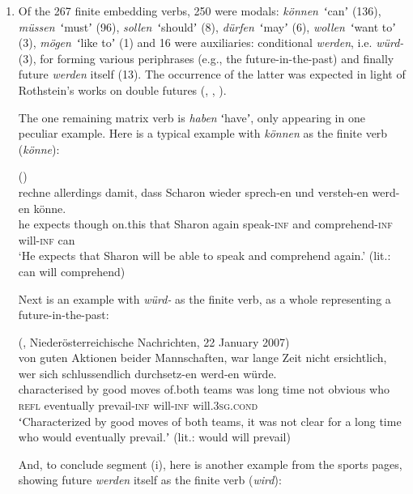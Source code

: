 \documentclass[output=paper,hidelinks]{langscibook}
\begin{document}
\begin{enumerate}[label=(\roman*)]
\item Of the 267 finite embedding verbs, 250 were modals: \emph{können}~ʻcanʼ (136), \emph{müssen}~ʻmustʼ (96), \emph{sollen}~ʻshouldʼ (8), \emph{dürfen}~ʻmayʼ (6), \emph{wollen}~ʻwant toʼ (3), \emph{mögen}~ʻlike toʼ (1) and 16 were auxiliaries: conditional \emph{werden}, i.e. \emph{würd-} (3), for forming various periphrases (e.g., the future-in-the-past) and finally future \emph{werden} itself (13). The occurrence of the latter was expected in light of Rothstein’s works on double futures (\citealt{Rothstein2012}, \citealt{Rothstein2013a}, \citealt{Rothstein2013b}). 

The one remaining matrix verb is \emph{haben} ʻhaveʼ, only appearing in one peculiar example. Here is a typical example with \emph{können} as the finite verb (\emph{könne}):


\ea\label{ex:reiner:20}  () \\
	{rechne}	{allerdings}	{damit,} {dass}	{Scharon}	{wieder}	{sprech-en}   {und}	{versteh-en}		{werd-en}	{könne.}\\
he	expects	though	on.this that	Sharon	again		speak-\textsc{inf}   and	comprehend-\textsc{inf}	will-\textsc{inf}	can \\ 
\glt    ‘He expects that Sharon will be able to speak and comprehend again.’ (lit.: can will comprehend) \\
\z 

Next is an example with \emph{würd-} as the finite verb, as a whole representing a future-in-the-past:



\ea\label{ex:reiner:21} 	 (, Niederösterreichische Nachrichten, 22 January 2007) \\
		{von}	{guten}	{Aktionen}	{beider}	{Mannschaften,}		{war}		{lange}		{Zeit}    {nicht}	{ersichtlich,}	{wer}	{sich}	{schlussendlich}  {durchsetz-en}	{werd-en}	{würde.}\\
characterised	by	good	moves		of.both teams			was		long		time not	obvious	who	\textsc{refl}	eventually   prevail-\textsc{inf}	will-\textsc{inf}	will.\textsc{3sg}.\textsc{cond}\\
\glt ʻCharacterized by good moves of both teams, it was not clear for a long time who would eventually prevail.ʼ (lit.: would will prevail)  \\
\z 

And, to conclude segment (i), here is another example from the sports pages, showing future \emph{werden} itself as the finite verb (\emph{wird}):


\end{enumerate}
\end{document}
